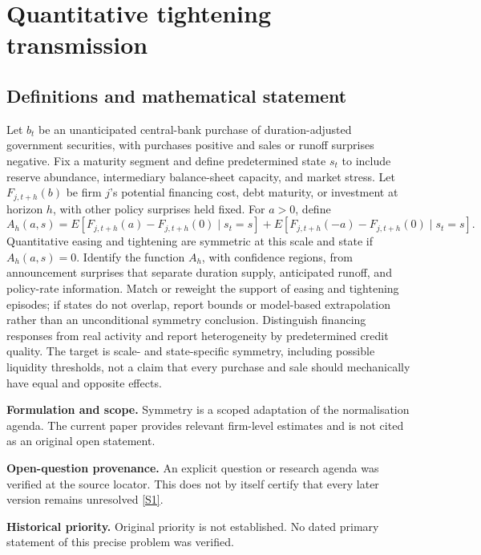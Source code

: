 \documentclass[11pt]{article}
\newcommand{\sref}[2]{\hyperlink{source:#1:#2}{[S#2]}}
\begin{document}
\section*{Quantitative tightening transmission}\label{30007527}
\subsection{Definitions and mathematical statement}
Let \(b_t\) be an unanticipated central-bank purchase of duration-adjusted government securities, with purchases positive and sales or runoff surprises negative. Fix a maturity segment and define predetermined state \(s_t\) to include reserve abundance, intermediary balance-sheet capacity, and market stress. Let \(F_{j,t+h}(b)\) be firm \(j\)'s potential financing cost, debt maturity, or investment at horizon \(h\), with other policy surprises held fixed. For \(a>0\), define
\[
A_h(a,s)=E[F_{j,t+h}(a)-F_{j,t+h}(0)\mid s_t=s]
+E[F_{j,t+h}(-a)-F_{j,t+h}(0)\mid s_t=s].
\]
Quantitative easing and tightening are symmetric at this scale and state if \(A_h(a,s)=0\). Identify the function \(A_h\), with confidence regions, from announcement surprises that separate duration supply, anticipated runoff, and policy-rate information. Match or reweight the support of easing and tightening episodes; if states do not overlap, report bounds or model-based extrapolation rather than an unconditional symmetry conclusion. Distinguish financing responses from real activity and report heterogeneity by predetermined credit quality. The target is scale- and state-specific symmetry, including possible liquidity thresholds, not a claim that every purchase and sale should mechanically have equal and opposite effects.

\par\textbf{Formulation and scope.} Symmetry is a scoped adaptation of the normalisation agenda. The current paper provides relevant firm-level estimates and is not cited as an original open statement.

\par\textbf{Open-question provenance.} An explicit question or research agenda was verified at the source locator. This does not by itself certify that every later version remains unresolved \sref{30007527}{1}.

\par\textbf{Historical priority.} Original priority is not established. No dated primary statement of this precise problem was verified.
\end{document}
